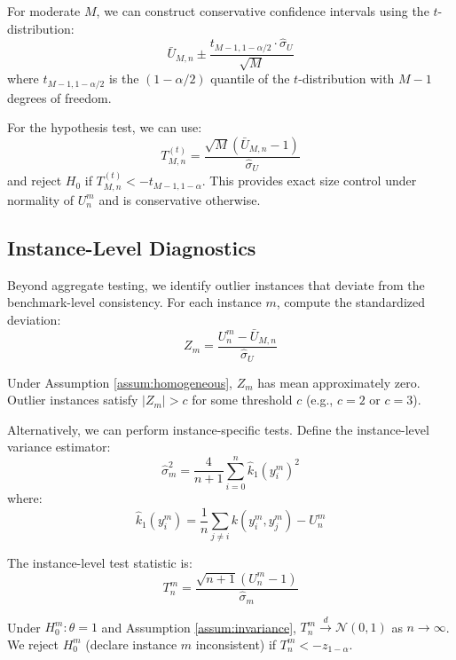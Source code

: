 \documentclass{article}
\theoremstyle{plain}
\theoremstyle{definition}
\theoremstyle{remark}
\begin{document}
For moderate $M$, we can construct conservative confidence intervals using the $t$-distribution:
\begin{equation}
    \bar{U}_{M,n} \pm \frac{t_{M-1, 1-\alpha/2} \cdot \hat{\sigma}_U}{\sqrt{M}}
\end{equation}
where $t_{M-1, 1-\alpha/2}$ is the $(1-\alpha/2)$ quantile of the $t$-distribution with $M-1$ degrees of freedom.

For the hypothesis test, we can use:
\begin{equation}
    T_{M,n}^{(t)} = \frac{\sqrt{M}(\bar{U}_{M,n} - 1)}{\hat{\sigma}_U}
\end{equation}
and reject $H_0$ if $T_{M,n}^{(t)} < -t_{M-1, 1-\alpha}$. This provides exact size control under normality of $U_n^m$ and is conservative otherwise.

\subsection{Instance-Level Diagnostics}

Beyond aggregate testing, we identify outlier instances that deviate from the benchmark-level consistency. For each instance $m$, compute the standardized deviation:
\begin{equation}
    Z_m = \frac{U_n^m - \bar{U}_{M,n}}{\hat{\sigma}_U}
\end{equation}

Under Assumption \ref{assum:homogeneous}, $Z_m$ has mean approximately zero. Outlier instances satisfy $|Z_m| > c$ for some threshold $c$ (e.g., $c = 2$ or $c = 3$).

Alternatively, we can perform instance-specific tests. Define the instance-level variance estimator:
\begin{equation}
    \hat{\sigma}_m^2 = \frac{4}{n+1}\sum_{i=0}^n \hat{k}_1(y_i^m)^2
\end{equation}
where:
\begin{equation}
    \hat{k}_1(y_i^m) = \frac{1}{n}\sum_{j \neq i} k(y_i^m, y_j^m) - U_n^m
\end{equation}

The instance-level test statistic is:
\begin{equation}
    T_n^m = \frac{\sqrt{n+1}(U_n^m - 1)}{\hat{\sigma}_m}
\end{equation}

Under $H_0^m: \theta = 1$ and Assumption \ref{assum:invariance}, $T_n^m \xrightarrow{d} \mathcal{N}(0, 1)$ as $n \to \infty$. We reject $H_0^m$ (declare instance $m$ inconsistent) if $T_n^m < -z_{1-\alpha}$.
\end{document}
